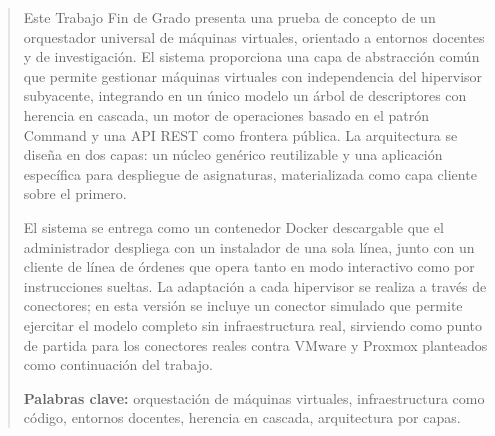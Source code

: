 \renewcommand{\abstractname}{Resumen}
\begin{abstract}
Este Trabajo Fin de Grado presenta una prueba de concepto de un
orquestador universal de máquinas virtuales, orientado a entornos
docentes y de investigación. El sistema proporciona una capa de
abstracción común que permite gestionar máquinas virtuales con
independencia del hipervisor subyacente, integrando en un único modelo
un árbol de descriptores con herencia en cascada, un motor de
operaciones basado en el patrón Command y una API REST como frontera
pública. La arquitectura se diseña en dos capas: un núcleo genérico
reutilizable y una aplicación específica para despliegue de
asignaturas, materializada como capa cliente sobre el primero.

El sistema se entrega como un contenedor Docker descargable que el
administrador despliega con un instalador de una sola línea, junto con
un cliente de línea de órdenes que opera tanto en modo interactivo
como por instrucciones sueltas. La adaptación a cada hipervisor se
realiza a través de conectores; en esta versión se incluye un
conector simulado que permite ejercitar el modelo completo sin
infraestructura real, sirviendo como punto de partida para los
conectores reales contra VMware y Proxmox planteados como continuación
del trabajo.

\medskip

\noindent\textbf{Palabras clave:} orquestación de máquinas virtuales,
infraestructura como código, entornos docentes, herencia en cascada,
arquitectura por capas.
\end{abstract}
